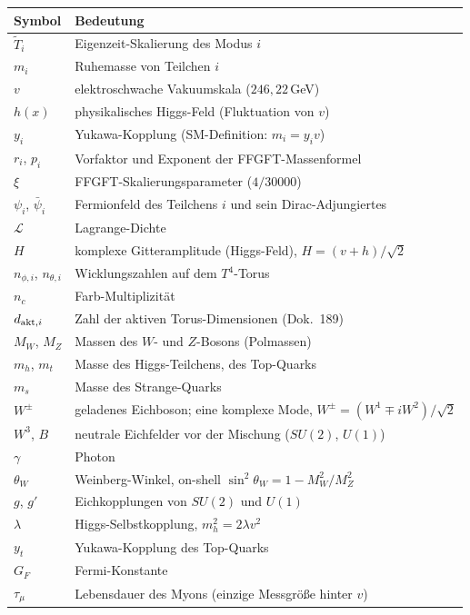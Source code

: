 \medskip
\begin{tabular}{@{}lp{9cm}@{}}
\toprule
\textbf{Symbol} & \textbf{Bedeutung} \\
\midrule
$\tilde T_i$ & Eigenzeit-Skalierung des Modus $i$ \\
$m_i$ & Ruhemasse von Teilchen $i$ \\
$v$ & elektroschwache Vakuumskala ($246{,}22$\,GeV) \\
$h(x)$ & physikalisches Higgs-Feld (Fluktuation von $v$) \\
$y_i$ & Yukawa-Kopplung (SM-Definition: $m_i = y_i v$) \\
$r_i$, $p_i$ & Vorfaktor und Exponent der FFGFT-Massenformel \\
$\xi$ & FFGFT-Skalierungsparameter ($4/30000$) \\
\midrule
$\psi_i$, $\bar\psi_i$ & Fermionfeld des Teilchens $i$ und sein Dirac-Adjungiertes \\
$\mathcal L$ & Lagrange-Dichte \\
$H$ & komplexe Gitteramplitude (Higgs-Feld), $H = (v+h)/\sqrt2$ \\
$n_{\phi,i}$, $n_{\theta,i}$ & Wicklungszahlen auf dem $T^4$-Torus \\
$n_c$ & Farb-Multiplizität \\
$d_{{\rm akt},i}$ & Zahl der aktiven Torus-Dimensionen (Dok.~189) \\
\midrule
$M_W$, $M_Z$ & Massen des $W$- und $Z$-Bosons (Polmassen) \\
$m_h$, $m_t$ & Masse des Higgs-Teilchens, des Top-Quarks \\
$m_s$ & Masse des Strange-Quarks \\
$W^\pm$ & geladenes Eichboson; eine komplexe Mode, $W^\pm = (W^1\mp iW^2)/\sqrt2$ \\
$W^3$, $B$ & neutrale Eichfelder vor der Mischung ($SU(2)$, $U(1)$) \\
$\gamma$ & Photon \\
$\theta_W$ & Weinberg-Winkel, on-shell $\sin^2\theta_W = 1 - M_W^2/M_Z^2$ \\
$g$, $g'$ & Eichkopplungen von $SU(2)$ und $U(1)$ \\
$\lambda$ & Higgs-Selbstkopplung, $m_h^2 = 2\lambda v^2$ \\
$y_t$ & Yukawa-Kopplung des Top-Quarks \\
$G_F$ & Fermi-Konstante \\
$\tau_\mu$ & Lebensdauer des Myons (einzige Messgröße hinter $v$) \\
\midrule

\end{tabular}
